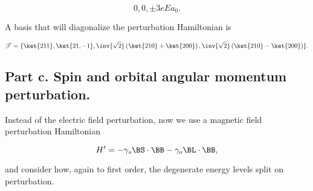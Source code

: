 \begin{equation}\label{eqn:qmTwoExamReflection:670}
0, 0, \pm 3 e E a_0.
\end{equation}

A basis that will diagonalize the perturbation Hamiltonian is

\begin{equation}\label{eqn:qmTwoExamReflection:690}
\beta' = \{ 
\ket{211}, \ket{21,-1},
\inv{\sqrt{2}} 
\left(\ket{210}
+\ket{200}
\right),
\inv{\sqrt{2}} 
\left(\ket{210}
-\ket{200}
\right)
\}.
\end{equation}


\subsection{Part c.  Spin and orbital angular momentum perturbation.}

Instead of the electric field perturbation, now we use a magnetic field perturbation Hamiltonian

\begin{equation}\label{eqn:qmTwoExamReflection:710}
H' = 
-\gamma_s \BS \cdot \BB 
-\gamma_o \BL \cdot \BB,
\end{equation}

and consider how, again to first order, the degenerate energy levels split on perturbation.

\EndArticle

